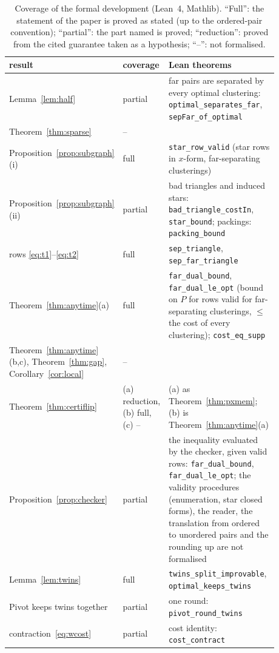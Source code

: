 \begin{table}[!tbp]
\centering
\caption{Coverage of the formal development (Lean~4, Mathlib).  ``Full'': the statement of the
paper is proved as stated (up to the ordered-pair convention); ``partial'':
the part named is proved; ``reduction'': proved from the cited guarantee
taken as a hypothesis; ``--'': not formalised.}\label{tab:lean}
\small
\begin{tabular}{p{0.30\linewidth}p{0.12\linewidth}p{0.46\linewidth}}
\toprule
result & coverage & Lean theorems \\
\midrule
Lemma~\ref{lem:half} & partial & far pairs are separated by every optimal clustering: \texttt{optimal\_separates\_far}, \texttt{sepFar\_of\_optimal} \\
Theorem~\ref{thm:sparse} & -- & \\
Proposition~\ref{prop:subgraph}(i) & full & \texttt{star\_row\_valid} (star rows in $x$-form, far-separating clusterings) \\
Proposition~\ref{prop:subgraph}(ii) & partial & bad triangles and induced stars: \texttt{bad\_triangle\_costIn}, \texttt{star\_bound}; packings: \texttt{packing\_bound} \\
rows \eqref{eq:t1}--\eqref{eq:t2} & full & \texttt{sep\_triangle}, \texttt{sep\_far\_triangle} \\
Theorem~\ref{thm:anytime}(a) & full & \texttt{far\_dual\_bound}, \texttt{far\_dual\_le\_opt} (bound on $P$ for rows valid for far-separating clusterings, $\le$ the cost of every clustering); \texttt{cost\_eq\_supp} \\
Theorem~\ref{thm:anytime}(b,c), Theorem~\ref{thm:gap}, Corollary~\ref{cor:local} & -- & \\
Theorem~\ref{thm:certiflip} & (a) reduction, (b) full, (c) -- & (a) as Theorem~\ref{thm:pxmem}; (b) is Theorem~\ref{thm:anytime}(a) \\
Proposition~\ref{prop:checker} & partial & the inequality evaluated by the checker, given valid rows: \texttt{far\_dual\_bound}, \texttt{far\_dual\_le\_opt}; the validity procedures (enumeration, star closed forms), the reader, the translation from ordered to unordered pairs and the rounding up are not formalised \\
Lemma~\ref{lem:twins} & full & \texttt{twins\_split\_improvable}, \texttt{optimal\_keeps\_twins} \\
Pivot keeps twins together & partial & one round: \texttt{pivot\_round\_twins} \\
contraction~\eqref{eq:wcost} & partial & cost identity: \texttt{cost\_contract} \\

\end{tabular}
\end{table}
